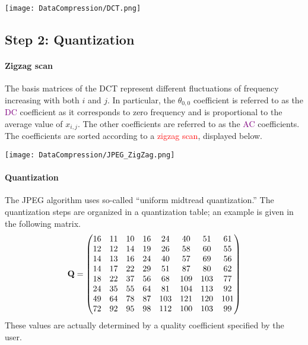 \documentclass[a4paper, 11pt, openany]{book}
\numberwithin{equation}{section}
\theoremstyle{plain}
\theoremstyle{definition}
\newcommand{\Important}[1]{\textcolor{red}{#1}}
\newcommand{\Define}[1]{\textcolor{purple}{#1}}
\begin{document}
\begin{center}
\texttt{[image: DataCompression/DCT.png]}
\end{center}




\subsection{Step 2: Quantization}

\paragraph{Zigzag scan}

The basis matrices of the DCT represent different fluctuations of frequency increasing with both $i$ and $j$. In particular, the $\theta_{0,0}$ coefficient is referred to as the \Define{DC} coefficient as it corresponds to zero frequency and is proportional to the average value of $x_{i,j}$. The other coefficients are referred to as the \Define{AC} coefficients.  The coefficients are sorted according to a \Important{zigzag scan}, displayed below.

\begin{center}
\texttt{[image: DataCompression/JPEG\_ZigZag.png]}
\end{center}


\paragraph{Quantization}
The JPEG algorithm uses so-called ``uniform midtread quantization.'' The quantization steps are organized in a quantization table; an example is given in the following matrix.
\[
    {\bf Q} = \begin{pmatrix}
    16 & 11 & 10 & 16 & 24 & 40 & 51 & 61\\
    12 & 12 & 14 & 19 & 26 & 58 & 60 & 55\\
    14 & 13 & 16 & 24 & 40 & 57 & 69 & 56\\
    14 & 17 & 22 & 29 & 51 & 87 & 80 & 62\\
    18 & 22 & 37 & 56 & 68 & 109 & 103 & 77\\
    24 & 35 & 55 & 64 & 81 & 104 & 113 & 92\\
    49 & 64 & 78 & 87 & 103 & 121 & 120 & 101\\
    72 & 92 & 95 & 98 & 112 & 100 & 103 & 99
    \end{pmatrix}
\]
These values are actually determined by a quality coefficient specified by the user.
\end{document}

